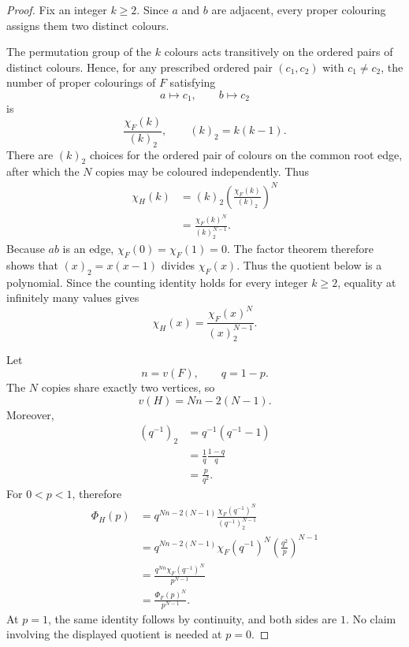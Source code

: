 \documentclass[11pt]{article}
\begin{document}
\begin{proof}
Fix an integer $k\ge2$. Since $a$ and $b$ are adjacent, every proper
colouring assigns them two distinct colours.

The permutation group of the $k$ colours acts transitively on the
ordered pairs of distinct colours. Hence, for any prescribed ordered
pair $(c_1,c_2)$ with $c_1\ne c_2$, the number of proper colourings
of $F$ satisfying
\[
    a\mapsto c_1,
    \qquad
    b\mapsto c_2
\]
is
\[
    \frac{\chi_F(k)}{(k)_2},
    \qquad
    (k)_2=k(k-1).
\]
There are $(k)_2$ choices for the ordered pair of colours on the
common root edge, after which the $N$ copies may be coloured
independently. Thus
\[
\begin{aligned}
    \chi_H(k)
    &=
    (k)_2
    \left(
      \frac{\chi_F(k)}{(k)_2}
    \right)^N
    \\
    &=
    \frac{\chi_F(k)^N}{(k)_2^{N-1}}.
\end{aligned}
\]
Because $ab$ is an edge, $\chi_F(0)=\chi_F(1)=0$.  The factor theorem
therefore shows that $(x)_2=x(x-1)$ divides $\chi_F(x)$.  Thus the
quotient below is a polynomial.  Since the
counting identity holds for every integer $k\ge2$, equality at
infinitely many values gives
\[
    \chi_H(x)
    =
    \frac{\chi_F(x)^N}{(x)_2^{N-1}}.
\]

Let
\[
    n=v(F),
    \qquad
    q=1-p.
\]
The $N$ copies share exactly two vertices, so
\[
    v(H)
    =
    Nn-2(N-1).
\]
Moreover,
\[
\begin{aligned}
    (q^{-1})_2
    &=
    q^{-1}(q^{-1}-1)
    \\
    &=
    \frac1q\frac{1-q}{q}
    \\
    &=
    \frac{p}{q^2}.
\end{aligned}
\]
For $0<p<1$, therefore
\[
\begin{aligned}
    \Phi_H(p)
    &=
    q^{Nn-2(N-1)}
    \frac{\chi_F(q^{-1})^N}
         {(q^{-1})_2^{N-1}}
    \\
    &=
    q^{Nn-2(N-1)}
    \chi_F(q^{-1})^N
    \left(\frac{q^2}{p}\right)^{N-1}
    \\
    &=
    \frac{
      q^{Nn}\chi_F(q^{-1})^N
    }{
      p^{N-1}
    }
    \\
    &=
    \frac{\Phi_F(p)^N}{p^{N-1}}.
\end{aligned}
\]
At $p=1$, the same identity follows by continuity, and both sides are
$1$.  No claim involving the displayed quotient is needed at $p=0$.
\end{proof}
\end{document}
